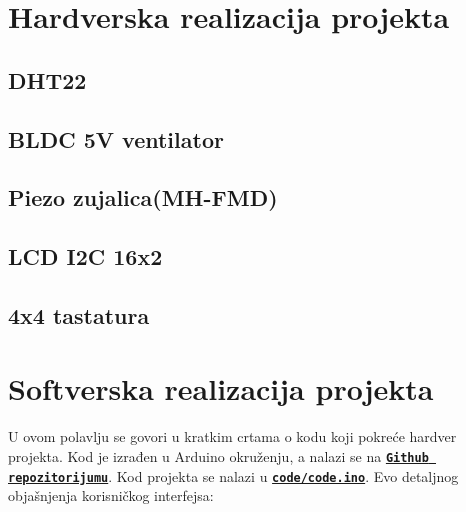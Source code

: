 \documentclass[a4paper, 12pt]{article}
\begin{document}
\pagebreak
\endgroup

\begingroup
\section{Hardverska realizacija projekta}

\vspace{10pt}

	\subsection{DHT22}

\vspace{10pt}


	\subsection{BLDC 5V ventilator}

\vspace{10pt}

	\subsection{Piezo zujalica(MH-FMD)}

\vspace{10pt}

	\subsection{LCD I2C 16x2}
	
\vspace{10pt}

	\subsection{4x4 tastatura}

\vspace{10pt}

\pagebreak
\endgroup

\begingroup
\sloppy

\section{Softverska realizacija projekta}

\vspace{10pt}

U ovom polavlju se govori u kratkim crtama o kodu koji pokreće hardver projekta. Kod je izrađen u Arduino okruženju, a nalazi se na \textbf{\texttt{\href{https://github.com/vgalovic/temperature-and-humidity-regulator.git}{Github repozitorijumu}}}. Kod projekta se nalazi u  \textbf{\texttt{\href{https://github.com/vgalovic/temperature-and-humidity-regulator/blob/main/code/code.ino}{code/code.ino}}}. Evo detaljnog objašnjenja korisničkog interfejsa:
 
\end{document}
